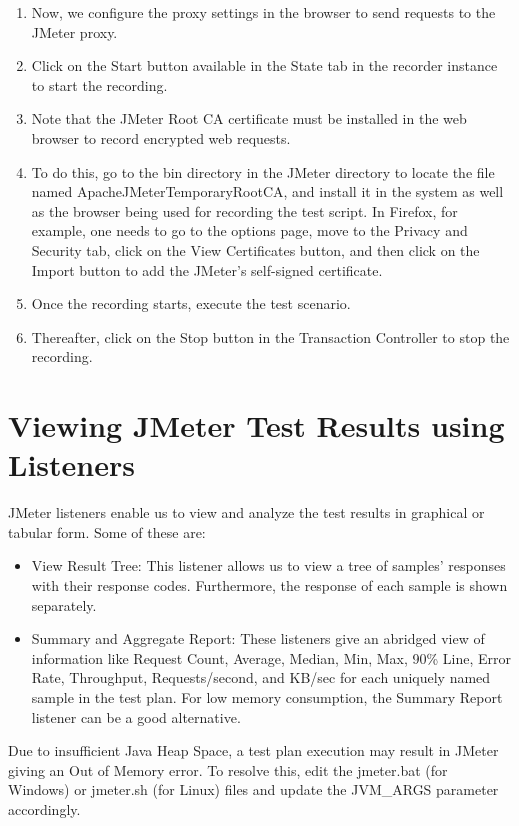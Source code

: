 \documentclass[12pt]{report}
\begin{document}
\begin{enumerate}
	\item Now, we configure the proxy settings in the browser to send requests to the JMeter proxy.
	\item Click on the Start button available in the State tab in the recorder instance to start the recording.
	\item Note that the JMeter Root CA certificate must be installed in the web browser to record encrypted web requests. 
	\item To do this, go to the bin directory in the JMeter directory to locate the file named ApacheJMeterTemporaryRootCA, and install it in the system as well as the browser being used for recording the test script. In Firefox, for example, one needs to go to the options page, move to the Privacy and Security tab, click on the View Certificates button, and then click on the Import button to add the JMeter's self-signed certificate.
	\item Once the recording starts, execute the test scenario.
	\item Thereafter, click on the Stop button in the Transaction Controller to stop the recording.
\end{enumerate}
\par
\section{Viewing JMeter Test Results using Listeners}
JMeter listeners enable us to view and analyze the test results in graphical or tabular form. Some of these are:
\begin{itemize}
	\item View Result Tree: This listener allows us to view a tree of samples' responses with their response codes. Furthermore, the response of each sample is shown separately.
	\item Summary and Aggregate Report: These listeners give an abridged view of information like Request Count, Average, Median, Min, Max, 90\% Line, Error Rate, Throughput, Requests/second, and KB/sec for each uniquely named sample in the test plan. For low memory consumption, the Summary Report listener can be a good alternative.
\end{itemize}
\par
Due to insufficient Java Heap Space, a test plan execution may result in JMeter giving an Out of Memory error. To resolve this, edit the jmeter.bat (for Windows) or jmeter.sh (for Linux) files and update the JVM\_ARGS parameter accordingly.
\\
\par
\end{document}

